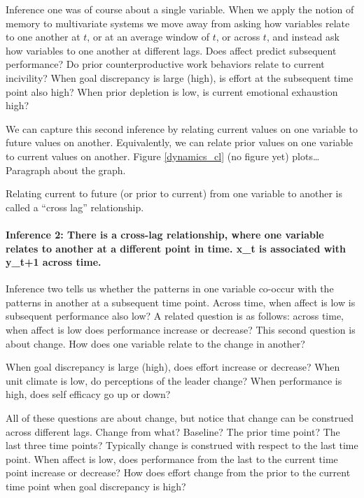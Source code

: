 \documentclass[english,,man]{apa6}
\let\oldparagraph\paragraph
\renewcommand{\paragraph}[1]{\oldparagraph{#1}\mbox{}}
\theoremstyle{definition}
\theoremstyle{definition}
\theoremstyle{definition}
\theoremstyle{remark}
\begin{document}
Inference one was of course about a single variable. When we apply the
notion of memory to multivariate systems we move away from asking how
variables relate to one another at \(t\), or at an average window of
\(t\), or across \(t\), and instead ask how variables to one another at
different lags. Does affect predict subsequent performance? Do prior
counterproductive work behaviors relate to current incivility? When goal
discrepancy is large (high), is effort at the subsequent time point also
high? When prior depletion is low, is current emotional exhaustion high?

We can capture this second inference by relating current values on one
variable to future values on another. Equivalently, we can relate prior
values on one variable to current values on another. Figure
\ref{dynamics_cl} (no figure yet) plots\ldots{}Paragraph about the
graph.

Relating current to future (or prior to current) from one variable to
another is called a \enquote{cross lag} relationship.

\hypertarget{inference-2-there-is-a-cross-lag-relationship-where-one-variable-relates-to-another-at-a-different-point-in-time.-x_t-is-associated-with-y_t1-across-time.}{%
\paragraph{Inference 2: There is a cross-lag relationship, where one
variable relates to another at a different point in time. x\_t is
associated with y\_t+1 across
time.}\label{inference-2-there-is-a-cross-lag-relationship-where-one-variable-relates-to-another-at-a-different-point-in-time.-x_t-is-associated-with-y_t1-across-time.}}

Inference two tells us whether the patterns in one variable co-occur
with the patterns in another at a subsequent time point. Across time,
when affect is low is subsequent performance also low? A related
question is as follows: across time, when affect is low does performance
increase or decrease? This second question is about change. How does one
variable relate to the change in another?

When goal discrepancy is large (high), does effort increase or decrease?
When unit climate is low, do perceptions of the leader change? When
performance is high, does self efficacy go up or down?

All of these questions are about change, but notice that change can be
construed across different lags. Change from what? Baseline? The prior
time point? The last three time points? Typically change is construed
with respect to the last time point. When affect is low, does
performance from the last to the current time point increase or
decrease? How does effort change from the prior to the current time
point when goal discrepancy is high?
\end{document}
